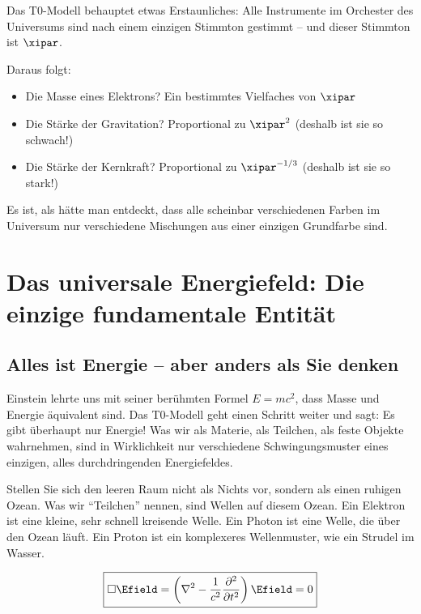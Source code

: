 	\begin{important}
		Das T0-Modell behauptet etwas Erstaunliches: Alle Instrumente im Orchester des Universums sind nach einem einzigen Stimmton gestimmt -- und dieser Stimmton ist $\xipar$. 
		
		Daraus folgt:
		\begin{itemize}
			\item Die Masse eines Elektrons? Ein bestimmtes Vielfaches von $\xipar$
			\item Die Stärke der Gravitation? Proportional zu $\xipar^2$ (deshalb ist sie so schwach!)
			\item Die Stärke der Kernkraft? Proportional zu $\xipar^{-1/3}$ (deshalb ist sie so stark!)
		\end{itemize}
	\end{important}
	
	Es ist, als hätte man entdeckt, dass alle scheinbar verschiedenen Farben im Universum nur verschiedene Mischungen aus einer einzigen Grundfarbe sind.
	
	\section{Das universale Energiefeld: Die einzige fundamentale Entität}
	
	\subsection{Alles ist Energie -- aber anders als Sie denken}
	
	Einstein lehrte uns mit seiner berühmten Formel $E = mc^2$, dass Masse und Energie äquivalent sind. Das T0-Modell geht einen Schritt weiter und sagt: Es gibt überhaupt nur Energie! Was wir als Materie, als Teilchen, als feste Objekte wahrnehmen, sind in Wirklichkeit nur verschiedene Schwingungsmuster eines einzigen, alles durchdringenden Energiefeldes.
	
	Stellen Sie sich den leeren Raum nicht als Nichts vor, sondern als einen ruhigen Ozean. Was wir ``Teilchen'' nennen, sind Wellen auf diesem Ozean. Ein Elektron ist eine kleine, sehr schnell kreisende Welle. Ein Photon ist eine Welle, die über den Ozean läuft. Ein Proton ist ein komplexeres Wellenmuster, wie ein Strudel im Wasser.
	
	\begin{equation}
		\boxed{\square \Efield = \left(\nabla^2 - \frac{1}{c^2}\frac{\partial^2}{\partial t^2}\right) \Efield = 0}
	\end{equation}
	
